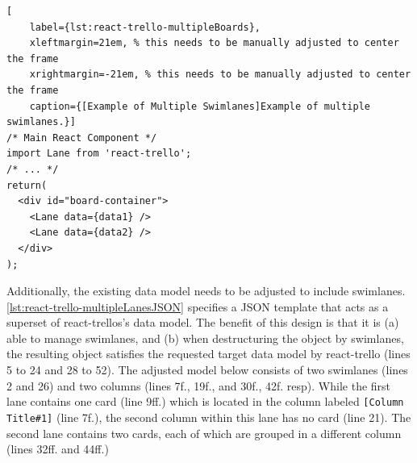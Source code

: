 \begin{spacing}{0.9}
    \lstset{language=JavaScript}
    \begin{lstlisting}[
    label={lst:react-trello-multipleBoards},
    xleftmargin=21em, % this needs to be manually adjusted to center the frame
    xrightmargin=-21em, % this needs to be manually adjusted to center the frame
    caption={[Example of Multiple Swimlanes]Example of multiple swimlanes.}]
/* Main React Component */
import Lane from 'react-trello';
/* ... */
return(
  <div id="board-container">
    <Lane data={data1} />
    <Lane data={data2} />
  </div>
);
    \end{lstlisting}
\end{spacing}


\noindent Additionally, the existing data model needs to be adjusted to include swimlanes. \autoref{lst:react-trello-multipleLanesJSON} specifies a \acrshort*{JSON} template that acts as a superset of react-trellos’s data model. The benefit of this design is that it is (a) able to manage swimlanes, and (b) when destructuring the object by swimlanes, the resulting object satisfies the requested target data model by react-trello (lines 5 to 24 and 28 to 52). The adjusted model below consists of two swimlanes (lines 2 and 26) and two columns (lines 7f., 19f., and 30f., 42f. resp). While the first lane contains one card (line 9ff.) which is located in the column labeled \texttt{[Column Title\#1]} (line 7f.), the second column within this lane has no card (line 21). The second lane contains two cards, each of which are grouped in a different column (lines 32ff. and 44ff.)

